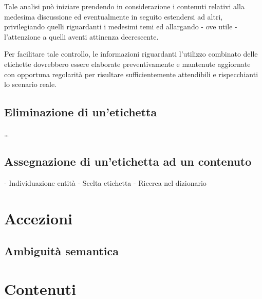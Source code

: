 \documentclass[10pt,a4paper,headinclude,footinclude,hidelinks]{scrreprt} %
\begin{document}
	Tale analisi può iniziare prendendo in considerazione i contenuti relativi alla medesima discussione ed eventualmente in seguito estendersi ad altri, privilegiando quelli riguardanti i medesimi temi ed allargando - ove utile - l'attenzione a quelli aventi attinenza decrescente.

	Per facilitare tale controllo, le informazioni riguardanti l'utilizzo combinato delle etichette dovrebbero essere elaborate preventivamente e mantenute aggiornate con opportuna regolarità per risultare sufficientemente attendibili e rispecchianti lo scenario reale.



	\subsection{Eliminazione di un'etichetta}
	\ldots

	\subsection{Assegnazione di un'etichetta ad un contenuto}
	- Individuazione entità
	- Scelta etichetta
	- Ricerca nel dizionario

	\section{Accezioni}
	\label{sec:stage:design:accezioni}

	\subsection{Ambiguità semantica}

	\section{Contenuti}
	\label{sec:stage:design:contenuti}
\end{document}
